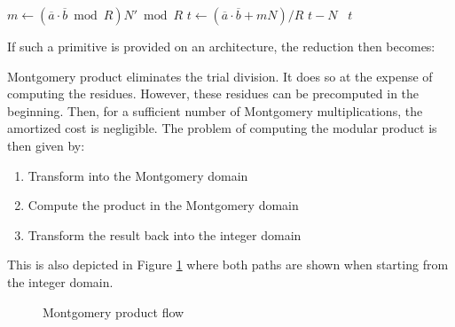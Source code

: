 \begin{algorithm}[hbt!]
  \begin{algorithmic}
      \State $m \gets (\overline{a} \cdot \overline{b} \bmod{R}) N' \bmod{R}$
      \State $t \gets (\overline{a} \cdot \overline{b} + m N)/R$
       \Return $t - N$
      \Else \, \Return $t$
      \EndIf 
   \EndFunction
  \end{algorithmic}
\end{algorithm}

If such a primitive is provided on an architecture, the reduction then
becomes:

\begin{algorithm}
  \begin{algorithmic}
      \State \Return {}
    \EndFunction
  \end{algorithmic}
\end{algorithm}

Montgomery product eliminates the trial division. It does so at the
expense of computing the residues. However, these residues can be
precomputed in the beginning. Then, for a sufficient number of
Montgomery multiplications, the amortized cost is negligible. The
problem of computing the modular product is then given by:
\begin{enumerate}
\item Transform into the Montgomery domain
\item Compute the product in the Montgomery domain
\item Transform the result back into the integer domain
\end{enumerate}
This is also depicted in Figure \ref{fig:montpro_flow} where both paths
are shown when starting from the integer domain.

\begin{figure}[hbt!]
  \centering
  \caption{Montgomery product flow}
  \label{fig:montpro_flow}
\end{figure}

